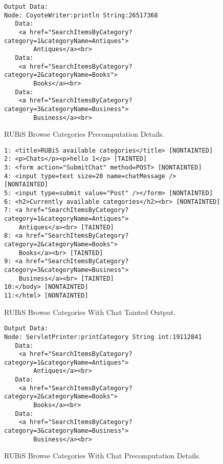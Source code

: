 \documentclass[msc,oneside]{ubcthesis}
\begin{document}
\begin{figure}[ht]
  \caption{\label{fig:rubisPrecompDetails} RUBiS Browse Categories Precomputation Details.}
\begin{verbatim}
Output Data:
Node: CoyoteWriter:println String:26517368
   Data: 
    <a href="SearchItemsByCategory?category=1&categoryName=Antiques">
        Antiques</a><br>
   Data: 
    <a href="SearchItemsByCategory?category=2&categoryName=Books">
        Books</a><br>
   Data: 
    <a href="SearchItemsByCategory?category=3&categoryName=Business">
        Business</a><br>
\end{verbatim}
\end{figure}

\begin{figure}[ht]
  \caption{\label{fig:outputBrowseCatB} RUBiS Browse Categories With Chat Tainted Output.}
\begin{verbatim}
1: <title>RUBiS available categories</title> [NONTAINTED]
2: <p>Chats</p><p>hello 1</p> [TAINTED]
3: <form action="SubmitChat" method=POST> [NONTAINTED]
4: <input type=text size=20 name=chatMessage /> [NONTAINTED]
5: <input type=submit value="Post" /></form> [NONTAINTED]
6: <h2>Currently available categories</h2><br> [NONTAINTED]
7: <a href="SearchItemsByCategory?category=1&categoryName=Antiques">
    Antiques</a><br> [TAINTED]
8: <a href="SearchItemsByCategory?category=2&categoryName=Books">
    Books</a><br> [TAINTED]
9: <a href="SearchItemsByCategory?category=3&categoryName=Business">
    Business</a><br> [TAINTED]
10:</body> [NONTAINTED]
11:</html> [NONTAINTED]
\end{verbatim}
\end{figure}

\begin{figure}[ht]
  \caption{\label{fig:rubisPrecompDetailsB} RUBiS Browse Categories With Chat Precomputation Details.}
\begin{verbatim}
Output Data:
Node: ServletPrinter:printCategory String int:19112841
   Data: 
    <a href="SearchItemsByCategory?category=1&categoryName=Antiques">
        Antiques</a><br>
   Data: 
    <a href="SearchItemsByCategory?category=2&categoryName=Books">
        Books</a><br>
   Data: 
    <a href="SearchItemsByCategory?category=3&categoryName=Business">
        Business</a><br>
\end{verbatim}
\end{figure}
\end{document}
